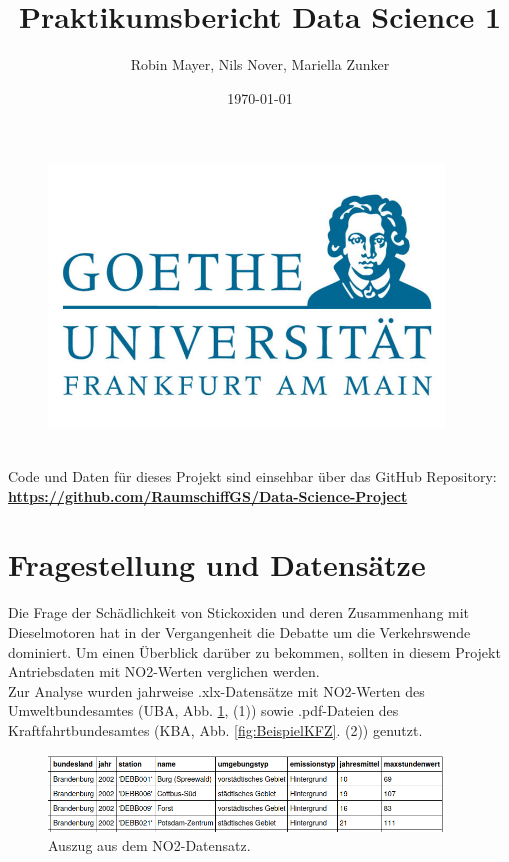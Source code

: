 \documentclass[11pt,a4paper,oneside,german]{article}
\title{Praktikumsbericht Data Science 1}
\author{Robin Mayer, Nils Nover, Mariella Zunker}
\date{\today}
\begin{document}
	\maketitle
	
	\begin{figure}[h]
		\centering
		\includegraphics[width=10.5cm]{uniemblem.jpg}		
	\end{figure}
	
	\newpage
	
	\tableofcontents
	\hspace{1cm} \\
	Code und Daten für dieses Projekt sind einsehbar über das GitHub Repository:\\
	\href{https://github.com/RaumschiffGS/Data-Science-Project}{\textbf{https://github.com/RaumschiffGS/Data-Science-Project}}
	
	\section{Fragestellung und Datensätze}
	
	Die Frage der Schädlichkeit von Stickoxiden und deren Zusammenhang mit Dieselmotoren hat in der Vergangenheit die Debatte um die Verkehrswende dominiert. Um einen Überblick darüber zu bekommen, sollten in diesem Projekt Antriebsdaten mit NO2-Werten verglichen werden. \\
	Zur Analyse wurden jahrweise .xlx-Datensätze mit NO2-Werten des Umweltbundesamtes (UBA, Abb. \ref{fig:BeispielNO2}, (1)) sowie .pdf-Dateien des Kraftfahrtbundesamtes (KBA, Abb. \ref{fig:BeispielKFZ}. (2)) genutzt.
	
	\begin{figure}[h!]
		\centering
		\includegraphics[width=10.5cm]{BeispielNO2.png}
		\caption{Auszug aus dem NO2-Datensatz.}
		\label{fig:BeispielNO2}
	\end{figure}
	
\end{document}
